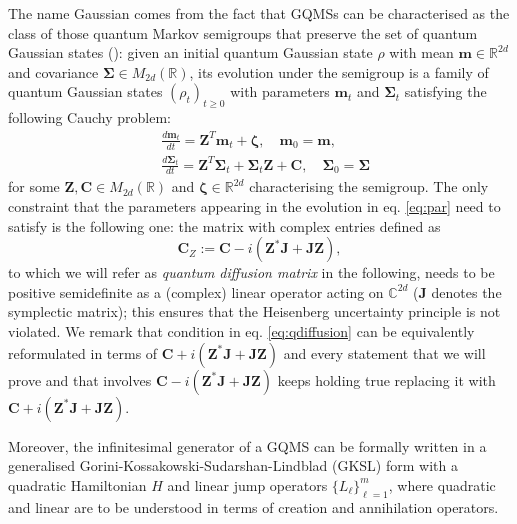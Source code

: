 \documentclass[preprint]{elsarticle}
\theoremstyle{definition}
\def\CC{\mathbb{C}}
\def\RR{\mathbb{R}}
\begin{document}
\bigskip The name Gaussian comes from the fact that GQMSs can be characterised as the class of those quantum Markov semigroups that preserve the set of quantum Gaussian states (\cite{PO22}): given an initial quantum Gaussian state $\rho$ with mean $\mathbf{m} \in \RR^{2d}$ and covariance $\mathbf{\Sigma} \in M_{2d}(\RR)$, its evolution under the semigroup is a family of quantum Gaussian states $(\rho_t)_{t \geq 0}$ with parameters $\mathbf{m}_t$ and $\mathbf{\Sigma}_t$ satisfying the following Cauchy problem:
\begin{align}\label{eq:par}
&\frac{d\mathbf{m}_t}{dt}=\mathbf{Z}^T\mathbf{m}_t+\boldsymbol{\zeta}, \quad \mathbf{m}_0=\mathbf{m},\\
&\frac{d\mathbf{\Sigma}_t}{dt}=\mathbf{Z}^T\mathbf{\Sigma}_t + \mathbf{\Sigma}_t \mathbf{Z} + \mathbf{C}, \quad \mathbf{\Sigma}_0=\mathbf{\Sigma}\nonumber\end{align}
for some $\mathbf{Z}, \mathbf{C} \in M_{2d}(\RR)$ and $\boldsymbol{\zeta} \in \RR^{2d}$ characterising the semigroup. The only constraint that the parameters appearing in the evolution in eq. \eqref{eq:par} need to satisfy is the following one: the matrix with complex entries defined as
\begin{equation} \label{eq:qdiffusion} \mathbf{C}_{Z}:=\mathbf{C}- i(\mathbf{Z}^*\mathbf{J}+\mathbf{J}\mathbf{Z}),\end{equation}
to which we will refer as \textit{quantum diffusion matrix} in the following, needs to be positive semidefinite as a (complex) linear operator acting on $\CC^{2d}$ ($\mathbf{J}$ denotes the symplectic matrix); this ensures that the Heisenberg uncertainty principle is not violated. We remark that condition in eq. \eqref{eq:qdiffusion} can be equivalently reformulated in terms of $\mathbf{C}+i(\mathbf{Z}^*\mathbf{J}+\mathbf{J}\mathbf{Z})$ and every statement that we will prove and that involves $\mathbf{C}- i(\mathbf{Z}^*\mathbf{J}+\mathbf{J}\mathbf{Z})$ keeps holding true replacing it with $\mathbf{C}+ i(\mathbf{Z}^*\mathbf{J}+\mathbf{J}\mathbf{Z})$.

Moreover, the infinitesimal generator of a GQMS can be formally written in a generalised Gorini-Kossakowski-Sudarshan-Lindblad (GKSL) form with a quadratic Hamiltonian $H$ and linear jump operators $\{L_\ell\}_{\ell=1}^m$, where quadratic and linear are to be understood in terms of creation and annihilation operators.
\end{document}

